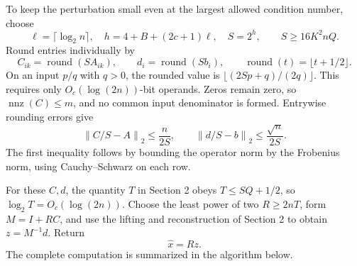 \documentclass[11pt]{article}
\newcommand{\norm}[1]{\left\lVert#1\right\rVert}
\newcommand{\nnz}{\operatorname{nnz}}
\newcommand{\round}{\operatorname{round}}
\begin{document}
To keep the perturbation small even at the largest allowed condition
number, choose
\begin{equation}\label{eq:roundscale}
 \ell=\lceil\log_2 n\rceil,\quad
 h=4+B+(2c+1)\ell,\quad S=2^h,
 \qquad S\geq16K^2nQ.
\end{equation}
Round entries individually by
\[
 C_{ik}=\round(SA_{ik}),\qquad d_i=\round(Sb_i),
 \qquad \round(t)=\lfloor t+1/2\rfloor.
\]
On an input $p/q$ with $q>0$, the rounded value is
$\lfloor(2Sp+q)/(2q)\rfloor$. This requires only $O_c(\log(2n))$-bit
operands. Zeros remain zero, so $\nnz(C)\leq m$, and no common input
denominator is formed. Entrywise rounding errors give
\begin{equation}\label{eq:rounderror}
 \norm{C/S-A}_2\leq\frac{n}{2S},\qquad
 \norm{d/S-b}_2\leq\frac{\sqrt n}{2S}.
\end{equation}
The first inequality follows by bounding the operator norm by the
Frobenius norm, using Cauchy--Schwarz on each row.

For these $C,d$, the quantity $T$ in Section 2 obeys $T\leq SQ+1/2$, so
$\log_2 T=O_c(\log(2n))$. Choose the least power of two $R\geq2nT$, form
$M=I+RC$, and use the lifting and reconstruction of Section 2 to obtain
$z=M^{-1}d$. Return
\begin{equation}\label{eq:output}
 \widehat x=Rz.
\end{equation}
The complete computation is summarized in the algorithm below.
\end{document}
